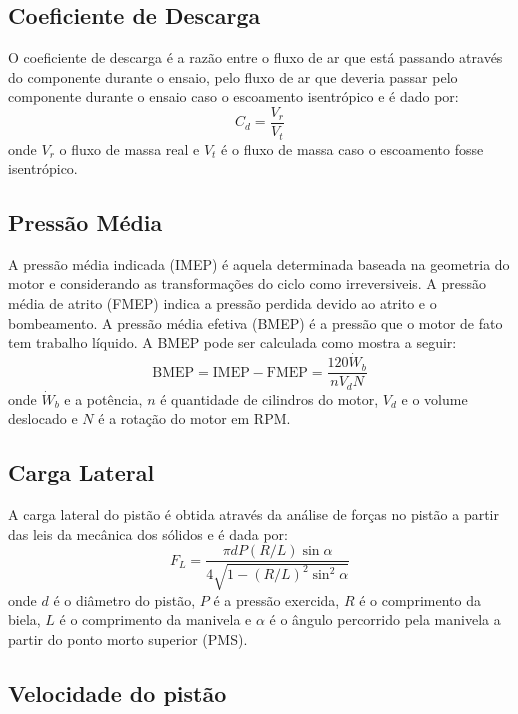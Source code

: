 \subsection{Coeficiente de Descarga}

O coeficiente de descarga é a razão entre o fluxo de ar que está passando através do componente durante o ensaio, pelo fluxo de ar que deveria passar pelo componente durante o ensaio caso o escoamento isentrópico e é dado por:
%
\begin{equation}
    C_d = \frac{V_r}{V_t}
    \label{eq:coef_descarga}
\end{equation}
%
onde $V_r$ o fluxo de massa real e $V_t$ é o fluxo de massa caso o escoamento fosse isentrópico.

\subsection{Pressão Média}

A pressão média indicada (IMEP) é aquela determinada baseada na geometria do motor e considerando as transformações do ciclo como irreversiveis. 
A pressão média de atrito (FMEP) indica a pressão perdida devido ao atrito e o bombeamento.
A pressão média efetiva (BMEP) é a pressão que o motor de fato tem trabalho líquido.
A BMEP pode ser calculada como mostra a seguir:
%
\begin{equation}
    \text{BMEP} = \text{IMEP} - \text{FMEP} =  \frac{120 \dot{W}_b}{n V_d N}
    \label{eq:bmep}
\end{equation}
%
onde $\dot{W}_b$ e a potência, $n$ é quantidade de cilindros do motor, $V_d$ e o volume deslocado e $N$ é a rotação do motor em RPM.

\subsection{Carga Lateral}

A carga lateral do pistão é obtida através da análise de forças no pistão a partir das leis da mecânica dos sólidos e é dada por:
%
\begin{equation}
    F_L = \frac{\pi d P (R/L) \sin\alpha}{4\sqrt{1-(R/L)^2\sin^2\alpha}}
    \label{eq:carga_lateral}
\end{equation}
%
onde $d$ é o diâmetro do pistão, $P$ é a pressão exercida, $R$ é o comprimento da biela, $L$ é o comprimento da manivela e $\alpha$ é o ângulo percorrido pela manivela a partir do ponto morto superior (PMS).

\subsection{Velocidade do pistão}

